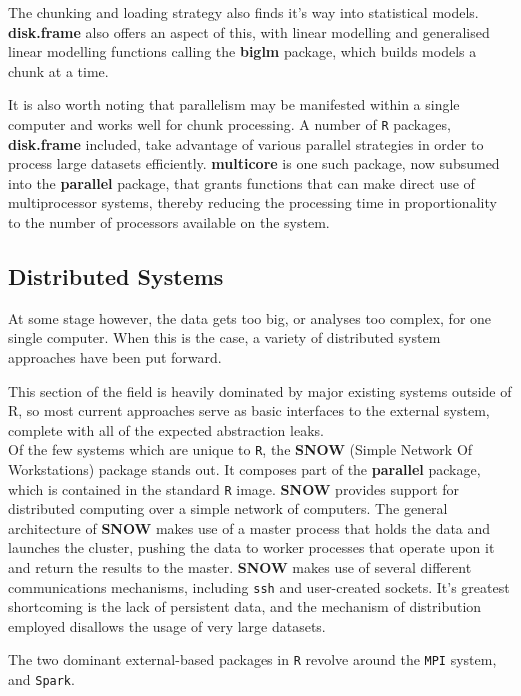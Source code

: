 The chunking and loading strategy also finds it's way into statistical models.
\textbf{disk.frame} also offers an aspect of this, with linear modelling and generalised linear modelling functions calling the \textbf{biglm} package, which builds models a chunk at a time\cite{lumley13}.

It is also worth noting that parallelism may be manifested within a single computer and works well for chunk processing.
A number of \texttt{R} packages, \textbf{disk.frame} included, take advantage of various parallel strategies in order to process large datasets efficiently.
\textbf{multicore} is one such package, now subsumed into the \textbf{parallel} package, that grants functions that can make direct use of multiprocessor systems, thereby reducing the processing time in proportionality to the number of processors available on the system\cite{team20:_r}.

\subsection{Distributed Systems}

At some stage however, the data gets too big, or analyses too complex, for one single computer.
When this is the case, a variety of distributed system approaches have been put forward.

This section of the field is heavily dominated by major existing systems outside of R, so most current approaches serve as basic interfaces to the external system, complete with all of the expected abstraction leaks\cite{spolsky2002abstraction}.\\

Of the few systems which are unique to \texttt{R}, the \textbf{SNOW} (Simple Network Of Workstations) package stands out.
It composes part of the \textbf{parallel} package, which is contained in the standard \texttt{R} image\cite{tierney18}.
\textbf{SNOW} provides support for distributed computing over a simple network of computers.
The general architecture of \textbf{SNOW} makes use of a master process that holds the data and launches the cluster, pushing the data to worker processes that operate upon it and return the results to the master.
\textbf{SNOW} makes use of several different communications mechanisms, including \texttt{ssh} and user-created sockets.
It's greatest shortcoming is the lack of persistent data, and the mechanism of distribution employed disallows the usage of very large datasets.

The two dominant external-based packages in \texttt{R} revolve around the \texttt{MPI} system, and \texttt{Spark}.\\

